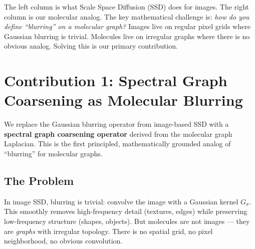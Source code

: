 \documentclass[12pt,a4paper]{article}
\begin{document}
The left column is what Scale Space Diffusion (SSD) does for images. The right column is our molecular analog. The key mathematical challenge is: \emph{how do you define ``blurring'' on a molecular graph?} Images live on regular pixel grids where Gaussian blurring is trivial. Molecules live on irregular graphs where there is no obvious analog. Solving this is our primary contribution.

\section{Contribution 1: Spectral Graph Coarsening as Molecular Blurring}

\begin{noveltybox}
We replace the Gaussian blurring operator from image-based SSD with a \textbf{spectral graph coarsening operator} derived from the molecular graph Laplacian. This is the first principled, mathematically grounded analog of ``blurring'' for molecular graphs.
\end{noveltybox}

\subsection{The Problem}

In image SSD, blurring is trivial: convolve the image with a Gaussian kernel $G_\sigma$. This smoothly removes high-frequency detail (textures, edges) while preserving low-frequency structure (shapes, objects). But molecules are not images --- they are \emph{graphs} with irregular topology. There is no spatial grid, no pixel neighborhood, no obvious convolution.
\end{document}
